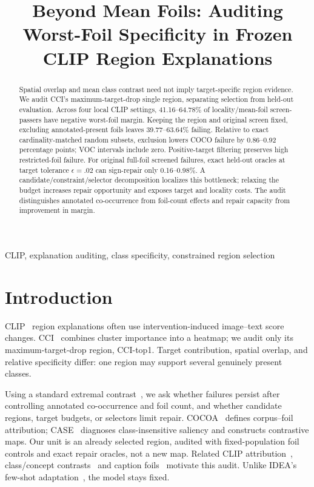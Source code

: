 \documentclass[10pt]{article}
\title{Beyond Mean Foils: Auditing Worst-Foil Specificity in Frozen CLIP Region Explanations}
\begin{document}
\maketitle
\begin{abstract}
Spatial overlap and mean class contrast need not imply target-specific region
evidence. We audit CCI's maximum-target-drop single region, separating selection
from held-out evaluation. Across four local CLIP settings, 41.16--64.78\% of
locality/mean-foil screen-passers have negative worst-foil margin. Keeping the
region and original screen fixed, excluding annotated-present foils leaves
39.77--63.64\% failing. Relative to exact cardinality-matched random subsets,
exclusion lowers COCO failure by 0.86--0.92 percentage points; VOC intervals
include zero. Positive-target filtering preserves high restricted-foil failure.
For original full-foil screened failures, exact held-out oracles at target
tolerance $\epsilon=.02$ can sign-repair only 0.16--0.98\%.
A candidate/constraint/selector decomposition localizes this bottleneck;
relaxing the budget increases repair opportunity and exposes target and locality
costs. The audit distinguishes annotated co-occurrence from foil-count effects
and repair capacity from improvement in margin.
\end{abstract}
\begin{keywords}
CLIP, explanation auditing, class specificity, constrained region selection
\end{keywords}

\section{Introduction}
CLIP~\cite{radford2021clip} region explanations often use intervention-induced
image--text score changes. CCI~\cite{agarwal2025cci} combines cluster importance
into a heatmap; we audit only its maximum-target-drop region, CCI-top1.
Target contribution, spatial overlap, and relative specificity differ:
one region may support several genuinely present classes.

Using a standard extremal contrast~\cite{rockafellar2000cvar}, we ask whether
failures persist after controlling annotated co-occurrence and foil count,
and whether candidate regions, target budgets, or selectors limit repair. COCOA~\cite{lin2023cocoa} defines corpus--foil
attribution; CASE~\cite{williamson2025case} diagnoses class-insensitive saliency
and constructs contrastive maps. Our unit is an already selected region, audited
with fixed-population foil controls and exact repair oracles, not a new map.
Related CLIP attribution~\cite{wang2023m2ib,li2023clipsurgery,dreyer2025cliplatent},
class/concept contrasts~\cite{li2026cdaclip,cheng2026mgaclip,visser2026contrastiveconcept}
and caption foils~\cite{yuksekgonul2023aro} motivate this audit.
Unlike IDEA's few-shot adaptation~\cite{ye2026idea}, the model stays fixed.
\end{document}
